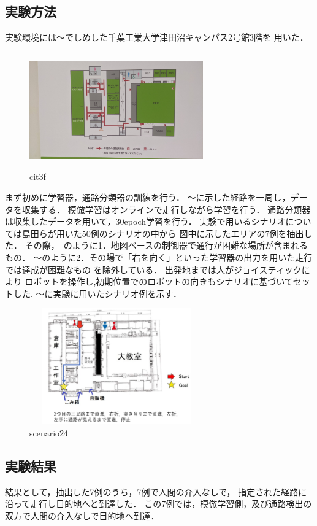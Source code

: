 \documentclass{sice-si}
\begin{document}
\subsection{実験方法}
実験環境には〜でしめした千葉工業大学津田沼キャンパス2号館3階を
用いた．
\begin{figure}[htbp]
    \begin{center}
    \includegraphics[width=75mm,height=50mm]{./figs/cit3f.jpg}
    \caption{cit3f}
    \end{center}
\end{figure}
まず初めに学習器，通路分類器の訓練を行う．
〜に示した経路を一周し，データを収集する．
模倣学習はオンラインで走行しながら学習を行う．
通路分類器は収集したデータを用いて，30epoch学習を行う．
実験で用いるシナリオについては島田らが用いた50例のシナリオの中から
図中に示したエリアの7例を抽出した．
その際，~のように1．地図ベースの制御器で通行が困難な場所が含まれるもの．
〜のように2．その場で「右を向く」といった学習器の出力を用いた走行では達成が困難なもの
を除外している．
出発地までは人がジョイスティックにより
ロボットを操作し,初期位置でのロボットの向きもシナリオに基づいてセットした.
〜に実験に用いたシナリオ例を示す．
\begin{figure}[htbp]
    \begin{center}
    \includegraphics[width=75mm,height=50mm]{./figs/scenario24.png}
    \caption{scenario24}
    \end{center}
\end{figure}
\subsection{実験結果}
結果として，抽出した7例のうち，7例で人間の介入なしで，
指定された経路に沿って走行し目的地へと到達した．
この7例では，模倣学習側，及び通路検出の双方で人間の介入なしで目的地へ到達．
\end{document}
